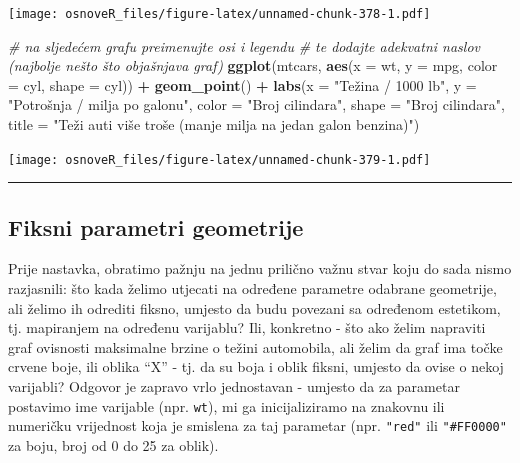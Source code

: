 \documentclass[]{book}
\newenvironment{Shaded}{\begin{snugshade}}{\end{snugshade}}
\newcommand{\KeywordTok}[1]{\textcolor[rgb]{0.13,0.29,0.53}{\textbf{#1}}}
\newcommand{\DataTypeTok}[1]{\textcolor[rgb]{0.13,0.29,0.53}{#1}}
\newcommand{\StringTok}[1]{\textcolor[rgb]{0.31,0.60,0.02}{#1}}
\newcommand{\CommentTok}[1]{\textcolor[rgb]{0.56,0.35,0.01}{\textit{#1}}}
\newcommand{\OperatorTok}[1]{\textcolor[rgb]{0.81,0.36,0.00}{\textbf{#1}}}
\newcommand{\NormalTok}[1]{#1}
\theoremstyle{definition}
\theoremstyle{definition}
\theoremstyle{definition}
\theoremstyle{remark}
\begin{document}
\texttt{[image: osnoveR\_files/figure-latex/unnamed-chunk-378-1.pdf]}

\begin{Shaded}
\begin{Highlighting}[]
\CommentTok{# na sljedećem grafu preimenujte osi i legendu}
\CommentTok{# te dodajte adekvatni naslov (najbolje nešto što objašnjava graf)}
\KeywordTok{ggplot}\NormalTok{(mtcars, }\KeywordTok{aes}\NormalTok{(}\DataTypeTok{x =}\NormalTok{ wt, }\DataTypeTok{y =}\NormalTok{ mpg, }\DataTypeTok{color =}\NormalTok{ cyl, }\DataTypeTok{shape =}\NormalTok{ cyl)) }\OperatorTok{+}\StringTok{ }\KeywordTok{geom_point}\NormalTok{() }\OperatorTok{+}
\KeywordTok{labs}\NormalTok{(}\DataTypeTok{x =} \StringTok{"Težina / 1000 lb"}\NormalTok{, }\DataTypeTok{y =} \StringTok{"Potrošnja / milja po galonu"}\NormalTok{,}
     \DataTypeTok{color =} \StringTok{"Broj cilindara"}\NormalTok{, }\DataTypeTok{shape =} \StringTok{"Broj cilindara"}\NormalTok{,}
   \DataTypeTok{title =} \StringTok{"Teži auti više troše (manje milja na jedan galon benzina)"}\NormalTok{)}
\end{Highlighting}
\end{Shaded}

\texttt{[image: osnoveR\_files/figure-latex/unnamed-chunk-379-1.pdf]}

\begin{center}\rule{0.5\linewidth}{\linethickness}\end{center}

\subsection{Fiksni parametri
geometrije}\label{fiksni-parametri-geometrije}

Prije nastavka, obratimo pažnju na jednu prilično važnu stvar koju do
sada nismo razjasnili: što kada želimo utjecati na određene parametre
odabrane geometrije, ali želimo ih odrediti fiksno, umjesto da budu
povezani sa određenom estetikom, tj. mapiranjem na određenu varijablu?
Ili, konkretno - što ako želim napraviti graf ovisnosti maksimalne
brzine o težini automobila, ali želim da graf ima točke crvene boje, ili
oblika ``X'' - tj. da su boja i oblik fiksni, umjesto da ovise o nekoj
varijabli? Odgovor je zapravo vrlo jednostavan - umjesto da za parametar
postavimo ime varijable (npr. \texttt{wt}), mi ga inicijaliziramo na
znakovnu ili numeričku vrijednost koja je smislena za taj parametar
(npr. \texttt{"red"} ili \texttt{"\#FF0000"} za boju, broj od 0 do 25 za
oblik).
\end{document}
